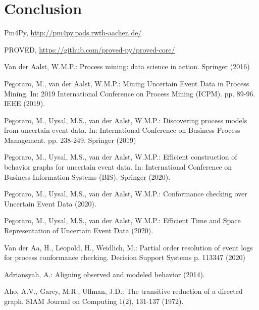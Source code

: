 \documentclass[a4paper,11pt,twoside]{pads-thesis}
\begin{document}
%

\chapter{Conclusion} \label{chap:conclusion}


% 

\begin{thebibliography}{5}

Pm4Py, \url{http://pm4py.pads.rwth-aachen.de/}

PROVED, \url{https://github.com/proved-py/proved-core/}

Van der Aalst, W.M.P.: Process mining: data science in action. Springer (2016)

Pegoraro, M., van der Aalst, W.M.P.: Mining Uncertain Event Data in Process Mining. In: 2019 International Conference on Process Mining (ICPM). pp. 89-96. IEEE (2019).

Pegoraro, M., Uysal, M.S., van der Aalst, W.M.P.: Discovering process models from uncertain event data. In: International Conference on Business Process Management. pp. 238-249. Springer (2019)

Pegoraro, M., Uysal, M.S., van der Aalst, W.M.P.: Efficient construction of behavior graphs for uncertain event data. In: International Conference on Business Information Systems (BIS). Springer (2020).

Pegoraro, M., Uysal, M.S., van der Aalst, W.M.P.: Conformance checking over Uncertain Event Data (2020).

Pegoraro, M., Uysal, M.S., van der Aalst, W.M.P.: Efficient Time and Space Representation of Uncertain Event Data (2020). 

Van der Aa, H., Leopold, H., Weidlich, M.: Partial order resolution of event logs for process conformance checking. Decision Support Systems p. 113347 (2020)

Adriansyah, A.: Aligning observed and modeled behavior (2014).

Aho, A.V., Garey, M.R., Ullman, J.D.: The transitive reduction of a directed graph.
SIAM Journal on Computing 1(2), 131-137 (1972).


\end{thebibliography}
\end{document}
